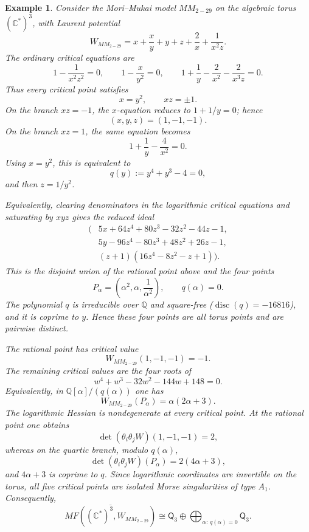 \documentclass[11pt]{amsart}
\newtheorem{example}{Example}[section]
\newcommand{\MorseCat}[1]{\mathsf{Q}_{#1}}
\begin{document}
\begin{example}
Consider the Mori--Mukai model $MM_{2-29}$ on the algebraic torus
$(\mathbb{C}^*)^3$, with Laurent potential
\[
W_{MM_{2-29}}=x+\frac{x}{y}+y+z+\frac{2}{x}+\frac{1}{x^2z}.
\]
The ordinary critical equations are
\[
1-\frac{1}{x^2z^2}=0,
\qquad
1-\frac{x}{y^2}=0,
\qquad
1+\frac{1}{y}-\frac{2}{x^2}-\frac{2}{x^3z}=0.
\]
Thus every critical point satisfies
\[
x=y^2,
\qquad
xz=\pm1.
\]
On the branch $xz=-1$, the $x$-equation reduces to $1+1/y=0$; hence
\[
(x,y,z)=(1,-1,-1).
\]
On the branch $xz=1$, the same equation becomes
\[
1+\frac{1}{y}-\frac{4}{x^2}=0.
\]
Using $x=y^2$, this is equivalent to
\[
q(y):=y^4+y^3-4=0,
\]
and then $z=1/y^2$.

Equivalently, clearing denominators in the logarithmic critical equations and
saturating by $xyz$ gives the reduced ideal
\[
\begin{aligned}
\bigl(&5x+64z^4+80z^3-32z^2-44z-1,\\
&5y-96z^4-80z^3+48z^2+26z-1,\\
&(z+1)(16z^4-8z^2-z+1)\bigr).
\end{aligned}
\]
This is the disjoint union of the rational point above and the four points
\[
P_{\alpha}=\left(\alpha^2,\alpha,\frac{1}{\alpha^2}\right),
\qquad
q(\alpha)=0.
\]
The polynomial $q$ is irreducible over $\mathbb{Q}$ and square-free
($\operatorname{disc}(q)=-16816$), and it is coprime to $y$. Hence these four
points are all torus points and are pairwise distinct.

The rational point has critical value
\[
W_{MM_{2-29}}(1,-1,-1)=-1.
\]
The remaining critical values are the four roots of
\[
w^4+w^3-32w^2-144w+148=0.
\]
Equivalently, in $\mathbb{Q}[\alpha]/(q(\alpha))$ one has
\[
W_{MM_{2-29}}(P_{\alpha})=\alpha(2\alpha+3).
\]
The logarithmic Hessian is nondegenerate at every critical point. At the
rational point one obtains
\[
\det(\theta_i\theta_jW)(1,-1,-1)=2,
\]
whereas on the quartic branch, modulo $q(\alpha)$,
\[
\det(\theta_i\theta_jW)(P_{\alpha})=2(4\alpha+3),
\]
and $4\alpha+3$ is coprime to $q$. Since logarithmic coordinates are invertible
on the torus, all five critical points are isolated Morse singularities of
type $A_1$. Consequently,
\[
\overline{MF((\mathbb{C}^*)^3,W_{MM_{2-29}})}
\cong \MorseCat{3}\oplus\bigoplus_{\alpha:\,q(\alpha)=0}\MorseCat{3}.
\]
\end{example}
\end{document}
